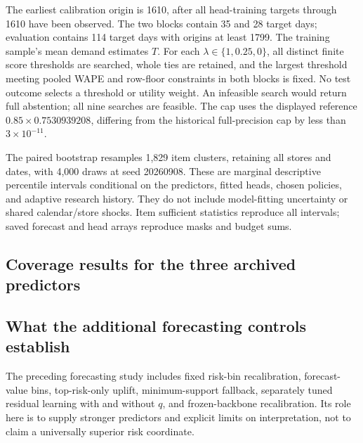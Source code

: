 The earliest calibration origin is 1610, after all head-training targets through 1610 have been observed. The two blocks contain 35 and 28 target days; evaluation contains 114 target days with origins at least 1799. The training sample's mean demand estimates $T$. For each $\lambda\in\{1,0.25,0\}$, all distinct finite score thresholds are searched, whole ties are retained, and the largest threshold meeting pooled WAPE and row-floor constraints in both blocks is fixed. No test outcome selects a threshold or utility weight. An infeasible search would return full abstention; all nine searches are feasible. The cap uses the displayed reference $0.85\times0.7530939208$, differing from the historical full-precision cap by less than $3\times10^{-11}$.




The paired bootstrap resamples 1,829 item clusters, retaining all stores and dates, with 4,000 draws at seed 20260908. These are marginal descriptive percentile intervals conditional on the predictors, fitted heads, chosen policies, and adaptive research history. They do not include model-fitting uncertainty or shared calendar/store shocks. Item sufficient statistics reproduce all intervals; saved forecast and head arrays reproduce masks and budget sums.

\subsection{Coverage results for the three archived predictors}
\label{sec:accuracy}


\subsection{What the additional forecasting controls establish}
The preceding forecasting study includes fixed risk-bin recalibration, forecast-value bins, top-risk-only uplift, minimum-support fallback, separately tuned residual learning with and without $q$, and frozen-backbone recalibration. Its role here is to supply stronger predictors and explicit limits on interpretation, not to claim a universally superior risk coordinate.

